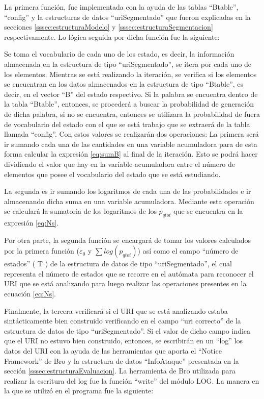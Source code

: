 La primera función, fue implementada con la ayuda de las tablas “Btable”, “config” y la estructuras de datos “uriSegmentado” que fueron explicadas en la secciones \ref{sssec:estructuraModelo} y \ref{sssec:estructuraSegmentacion} respectivamente.  Lo lógica seguida por dicha función fue la siguiente:

Se toma el vocabulario de cada uno de los estado, es decir, la información almacenada en la estructura de tipo “uriSegmentado”, se itera por cada uno de los elementos. Mientras se está realizando la iteración, se verifica si los elementos se encuentran en los datos almacenados en la estructura de tipo “Btable”, es decir, en el vector “B” del estado respectivo. Si la palabra se encuentra dentro de la tabla “Btable”, entonces, se procederá a buscar la probabilidad de generación de dicha palabra, si no se encuentra, entonces se utilizara la probabilidad de fuera de vocabulario del estado con el que se está trabajo que se extraerá de la tabla llamada “config”. Con estos valores se realizarán dos operaciones: La primera será ir sumando cada una de las cantidades en una variable acumuladora para de esta forma calcular  la expresión \ref{eq:sumB} al final de la iteración. Esto se podrá hacer dividiendo el valor que hay en la variable acumuladora entre el número de elementos que posee el vocabulario del estado que se está estudiando.

La segunda es ir sumando los logaritmos de cada una de las probabilidades e ir almacenando dicha suma en una variable acumuladora. Mediante esta operación se calculará la sumatoria de los logaritmos de los $p_{qtot}$ que se encuentra en la expresión \ref{eq:Ns}.

Por otra parte, la segunda función se encargará de tomar los valores calculados por la primera función ($\varepsilon_{0}$ y $\sum log(p_{qtot})$)  así como el campo “número de estados” ( T ) de la estructura de datos de tipo “uriSegmentado”, el cual representa el número de estados que se recorre en el autómata para reconocer el URI que se está analizando para luego realizar las operaciones presentes en la ecuación \ref{eq:Ns}.

Finalmente, la tercera verificará si el URI que se está analizando estaba sintácticamente bien construido verificando en el campo “uri correcto” de la estructura de datos de tipo “uriSegmentado”. Si el valor de dicho campo indica que el URI no estuvo bien construido, entonces, se escribirán en un “log”  los datos del URI  con la ayuda de las herramientas que aporta el “Notice Framework” de Bro y la estructura de datos “InfoAtaque” presentada en la sección \ref{sssec:estructuraEvaluacion}. La herramienta de Bro utilizada para realizar la escritura del log fue la función “write” del módulo LOG. La manera en la que se utilizó en el programa fue la siguiente:

